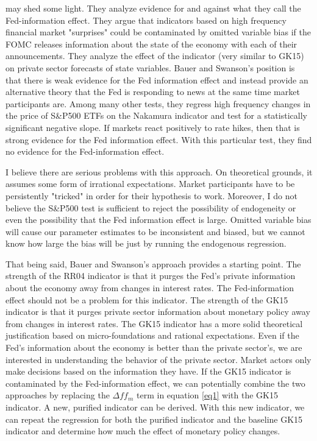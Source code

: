 \documentclass[a4paper,man,floatsintext,natbib]{apa6}
\begin{document}
	\cite{Bauer2020} may shed some light. They analyze evidence for and against what they call the Fed-information effect. They argue that indicators based on high frequency financial market "surprises" could be contaminated by omitted variable bias if the FOMC releases information about the state of the economy with each of their announcements. They analyze the effect of the \cite{Nakamura2018} indicator (very similar to GK15) on private sector forecasts of state variables. Bauer and Swanson's position is that there is weak evidence for the Fed information effect and instead provide an alternative theory that the Fed is responding to news at the same time market participants are. Among many other tests, they regress high frequency changes in the price of S\&P500 ETFs on the Nakamura indicator and test for a statistically significant negative slope. If markets react positively to rate hikes, then that is strong evidence for the Fed information effect. With this particular test, they find no evidence for the Fed-information effect. 
	
	I believe there are serious problems with this approach. On theoretical grounds, it assumes some form of irrational expectations. Market participants have to be persistently "tricked" in order for their hypothesis to work. Moreover, I do not believe the S\&P500 test is sufficient to reject the possibility of endogeneity or even the possibility that the Fed information effect is large. Omitted variable bias will cause our parameter estimates to be inconsistent and biased, but we cannot know how large the bias will be just by running the endogenous regression. 
	
	That being said, Bauer and Swanson's approach provides a starting point. The strength of the RR04 indicator is that it purges the Fed's private information about the economy away from changes in interest rates. The Fed-information effect should not be a problem for this indicator. The strength of the GK15 indicator is that it purges private sector information about monetary policy away from changes in interest rates. The GK15 indicator has a more solid theoretical justification based on micro-foundations and rational expectations. Even if the Fed's information about the economy is better than the private sector's, we are interested in understanding the behavior of the private sector. Market actors only make decisions based on the information they have. If the GK15 indicator is contaminated by the Fed-information effect, we can potentially combine the two approaches by replacing the \(\Delta ff_m\) term in equation \ref{eq1} with the GK15 indicator. A new, purified indicator can be derived. With this new indicator, we can repeat the \cite{Bauer2020} regression for both the purified indicator and the baseline GK15 indicator and determine how much the effect of monetary policy changes.
\end{document}
